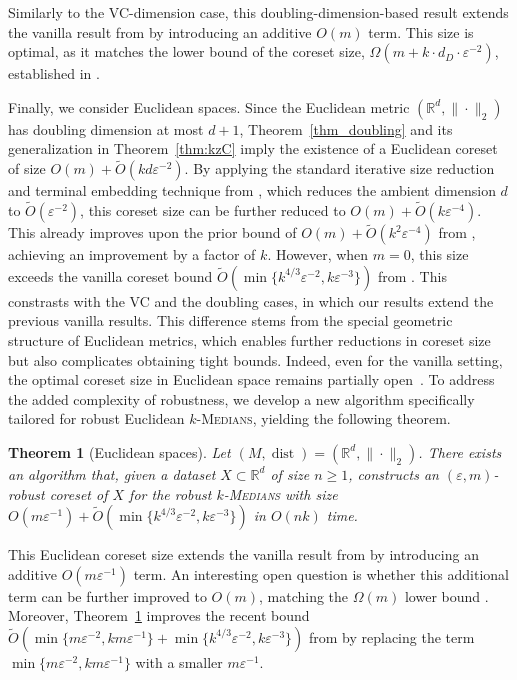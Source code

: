 \documentclass[11pt,letterpaper]{article}
\newtheorem{theorem}{Theorem}[section]
\theoremstyle{definition}
\newcommand{\eps}{\varepsilon}
\newcommand{\ProblemName}[1]{\textsc{#1}}
\newcommand{\kMedian}{\ProblemName{$k$-Medians}\xspace}
\DeclareMathOperator{\dist}{dist}
\begin{document}
Similarly to the VC-dimension case, this doubling-dimension-based result extends the vanilla result from \cite{Cohen25} by introducing an additive \( O(m) \) term.  
%
This size is optimal, as it matches the lower bound of the coreset size,  \( \Omega(m + k \cdot d_D \cdot \eps^{-2}) \), established in \cite{huang2022near,Cohen2022Towards}.  
%



Finally, we consider Euclidean spaces.
%
Since the Euclidean metric \( (\mathbb{R}^d, \|\cdot\|_2) \) has doubling dimension at most \( d+1 \), Theorem~\ref{thm_doubling} and its generalization in Theorem~\ref{thm:kzC} imply the existence of a Euclidean coreset of size \( O(m) + \tilde{O}(k  d  \eps^{-2}) \).  
%
By applying the standard iterative size reduction and terminal embedding technique from \cite{BJKW21,NN19}, which reduces the ambient dimension $d$ to $\tilde{O}(\eps^{-2})$, this coreset size can be further reduced to \( O(m) + \tilde{O}(k\eps^{-4} )\). 
%
This already improves upon the prior bound of \( O(m) + \tilde{O}(k^2 \eps^{-4}) \) from \cite{huang2025coresets}, achieving an improvement by a factor of \( k \).  
%
However, when \( m = 0 \), this size exceeds the vanilla coreset bound \( \tilde{O}(\min\{k^{4/3}\eps^{-2}, k\eps^{-3}\}) \) from \cite{cohen2021new,cohen2022improved,huang2024optimal}.
%
This constrasts with the VC and the doubling cases, in which our results extend the previous vanilla results.
%
This difference stems from the special geometric structure of Euclidean metrics, which enables further reductions in coreset size but also complicates obtaining tight bounds.
%
Indeed, even for the vanilla setting, the optimal coreset size in Euclidean space remains partially open~\cite{huang2024optimal}.
%
To address the added complexity of robustness, we develop a new algorithm specifically tailored for robust Euclidean \kMedian, yielding the following theorem.
%

\begin{theorem}[Euclidean spaces] \label{thm_Euc}
Let $(M,\dist)=(\mathbb{R}^d,\|\cdot\|_2)$. 
%
There exists an algorithm that, given a dataset $X\subset \mathbb{R}^d$ of size $n\geq 1$, constructs an $(\eps,m)$-robust coreset of 
$X$ for the robust \kMedian with size $O(m \eps^{-1})+\tilde{O}(\min\{k^{4/3}\eps^{-2}, k\eps^{-3}\})$ in $O(nk)$ time.
%
\end{theorem}

This Euclidean coreset size extends the vanilla result from \cite{cohen2021new,cohen2022improved,huang2024optimal} by introducing an additive \( O(m \eps^{-1}) \) term.  
%
An interesting open question is whether this additional term can be further improved to \( O(m) \), matching the $\Omega(m)$ lower bound \cite{huang2022near}.  
%
Moreover, Theorem~\ref{thm_Euc} improves the recent bound \( \tilde{O}(\min\{m\eps^{-2}, km \eps^{-1}\} + \min\{k^{4/3}\eps^{-2}, k\eps^{-3}\}) \) from \cite{jiang2025coresets} by replacing the term \(\min\{m\eps^{-2}, km \eps^{-1}\}\) with a smaller \( m \eps^{-1} \).
%
\end{document}
